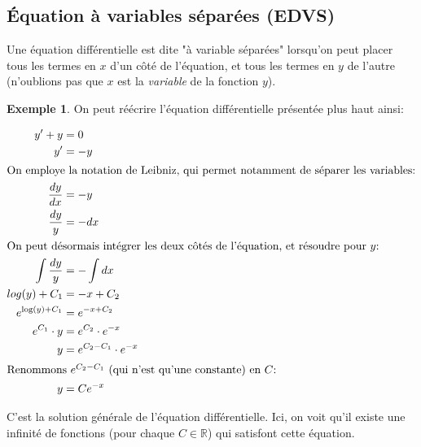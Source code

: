 \documentclass{report}
\theoremstyle{plain}
\theoremstyle{definition}
\newtheorem{exmp}[thm]{Exemple}
\theoremstyle{remark}
\begin{document}
\subsection{Équation à variables séparées (EDVS)}
Une équation différentielle est dite "à variable séparées" lorsqu'on peut placer tous les termes en $x$ d'un côté de l'équation, et tous les termes en $y$ de l'autre (n'oublions pas que $x$ est la \emph{variable} de la fonction $y$).
\begin{exmp}
On peut réécrire l'équation différentielle présentée plus haut ainsi:

\begin{align*}
	y' + y &= 0 \\
	y' &= -y \\
\intertext{On employe la notation de Leibniz, qui permet notamment de séparer les variables:}
	\dfrac{dy}{dx} &= -y \\
	\dfrac{dy}{y} &= -dx \\
\intertext{On peut désormais intégrer les deux côtés de l'équation, et résoudre pour $y$:}
	\int \dfrac{dy}{y} &= -\int dx \\
	log(y) + C_1 &= -x + C_2 \\
	e^{\log(y) + C_1} &= e^{-x + C_2} \\
	e^{C_1} \cdot y &= e^{C_2} \cdot e^{-x} \\
	y &= e^{C_2 - C_1} \cdot e^{-x} \\
\intertext{Renommons $e^{C_2 - C_1}$ (qui n'est qu'une constante) en $C$:}
	y &= Ce^{-x}
\end{align*}

C'est la solution générale de l'équation différentielle. Ici, on voit qu'il existe une infinité de fonctions (pour chaque $C \in \mathbb{R}$) qui satisfont cette équation.

\end{exmp}
\end{document}
